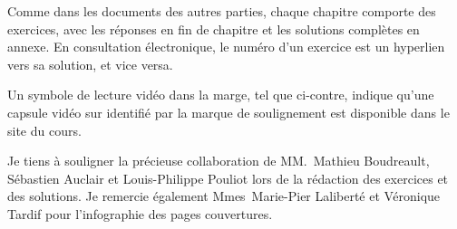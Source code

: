 Comme dans les documents des autres parties, chaque chapitre comporte
des exercices, avec les réponses en fin de chapitre et les solutions
complètes en annexe. En consultation électronique, le numéro d'un
exercice est un hyperlien vers sa solution, et vice versa.

Un symbole de lecture vidéo dans la marge, tel que ci-contre, indique
qu'une capsule vidéo sur  identifié par la marque de
soulignement est disponible dans le site du cours.

Je tiens à souligner la précieuse collaboration de MM.~Mathieu
Boudreault, Sébastien Auclair et Louis-Philippe Pouliot lors de la
rédaction des exercices et des solutions. Je remercie également
Mmes~Marie-Pier Laliberté et Véronique Tardif pour l'infographie des
pages couvertures.

